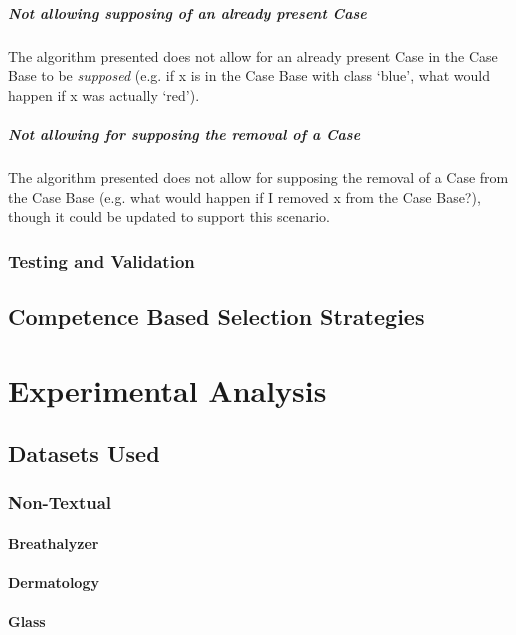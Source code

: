 \documentclass[a4paper,11pt]{report}
\begin{document}
\paragraph{Not allowing supposing of an already present Case}
The algorithm presented does not allow for an already present Case in the Case Base to be \emph{supposed} (e.g. if x is in the Case Base with class `blue', what would happen if x was actually `red').

\paragraph{Not allowing for supposing the removal of a Case}
The algorithm presented does not allow for supposing the removal of a Case from the Case Base (e.g. what would happen if I removed x from the Case Base?), though it could be updated to support this scenario.
 



\subsection{Testing and Validation}

\section{Competence Based Selection Strategies}
\chapter{Experimental Analysis\label{cha:expanalysis}}
\section{Datasets Used}
\subsection{Non-Textual}
\subsubsection*{Breathalyzer}\label{sec:breathalyzer}
\subsubsection*{Dermatology}\label{sec:dermatology}
\subsubsection*{Glass}\label{sec:glass}
\end{document}
